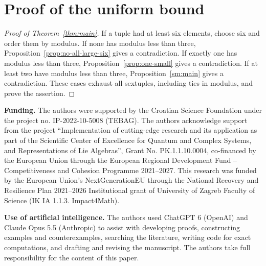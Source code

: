 \documentclass[12pt]{article}
\numberwithin{equation}{section}
\begin{document}
\section{Proof of the uniform bound}

\begin{proof}[Proof of Theorem~\ref{thm:main}]
If a tuple had at least six elements, choose six and order them by
modulus. If none has modulus less than three, Proposition~\ref{prop:no-all-large-six}
gives a contradiction. If exactly one has modulus less than three,
Proposition~\ref{prop:one-small} gives a contradiction. If at least
two have modulus less than three, Proposition~\ref{sm:main} gives a
contradiction. These cases exhaust all sextuples, including ties in
modulus, and prove the assertion.
\end{proof}

\par\medskip
\noindent\textbf{Funding.} The authors were supported by the Croatian Science Foundation under the project no. IP-2022-10-5008 (TEBAG). The authors acknowledge support from the project ``Implementation of cutting-edge research and its application as part of the Scientific Center of Excellence for Quantum and Complex Systems, and Representations of Lie Algebras'', Grant No. PK.1.1.10.0004, co-financed by the European Union through the European Regional Development Fund -- Competitiveness and Cohesion Programme 2021--2027. This research was funded by the European Union's NextGenerationEU through the National Recovery and Resilience Plan 2021--2026 Institutional grant of University of Zagreb Faculty of Science (IK IA 1.1.3. Impact4Math).

\medskip
\noindent\textbf{Use of artificial intelligence.} The authors used ChatGPT 6 (OpenAI) and Claude Opus 5.5 (Anthropic) to assist with developing proofs, constructing examples and counterexamples, searching the literature, writing code for exact computations, and drafting and revising the manuscript. The authors take full responsibility for the content of this paper.
\end{document}
